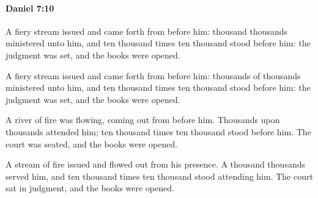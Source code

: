 		\paragraph{Daniel 7:10} %
			\label{DANIEL-7-10}

			A fiery stream issued and came forth from before him: thousand thousands ministered unto him, and ten thousand times ten thousand stood before him: the judgment was set, and the books were opened.

			\begin{versebox}
					\item[BHS] 
					\item[LXX] 
					\item[ASV] A fiery stream issued and came forth from before him: thousands of thousands ministered unto him, and ten thousand times ten thousand stood before him: the judgment was set, and the books were opened.
					\item[NIV] A river of fire was flowing, coming out from before him. Thousands upon thousands attended him; ten thousand times ten thousand stood before him. The court was seated, and the books were opened.
					\item[NRSV] A stream of fire issued and flowed out from his presence. A thousand thousands served him, and ten thousand times ten thousand stood attending him. The court sat in judgment, and the books were opened.
			\end{versebox}

